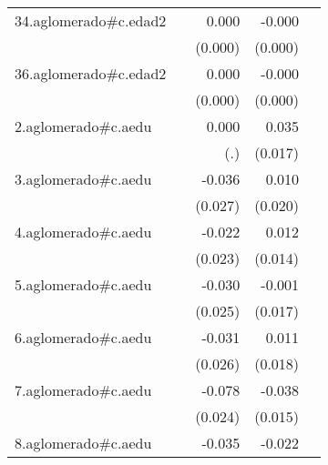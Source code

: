 {\begin{longtable}{l*{4}{D{.}{.}{-1}}}
\addlinespace
34.aglomerado#c.edad2&                     &       0.000         &      -0.000\sym{*}  &                     \\
            &                     &     (0.000)         &     (0.000)         &                     \\
\addlinespace
36.aglomerado#c.edad2&                     &       0.000         &      -0.000         &                     \\
            &                     &     (0.000)         &     (0.000)         &                     \\
\addlinespace
2.aglomerado#c.aedu&                     &       0.000         &       0.035\sym{*}  &                     \\
            &                     &         (.)         &     (0.017)         &                     \\
\addlinespace
3.aglomerado#c.aedu&                     &      -0.036         &       0.010         &                     \\
            &                     &     (0.027)         &     (0.020)         &                     \\
\addlinespace
4.aglomerado#c.aedu&                     &      -0.022         &       0.012         &                     \\
            &                     &     (0.023)         &     (0.014)         &                     \\
\addlinespace
5.aglomerado#c.aedu&                     &      -0.030         &      -0.001         &                     \\
            &                     &     (0.025)         &     (0.017)         &                     \\
\addlinespace
6.aglomerado#c.aedu&                     &      -0.031         &       0.011         &                     \\
            &                     &     (0.026)         &     (0.018)         &                     \\
\addlinespace
7.aglomerado#c.aedu&                     &      -0.078\sym{**} &      -0.038\sym{*}  &                     \\
            &                     &     (0.024)         &     (0.015)         &                     \\
\addlinespace
8.aglomerado#c.aedu&                     &      -0.035         &      -0.022         &                     \\

\end{longtable}}
